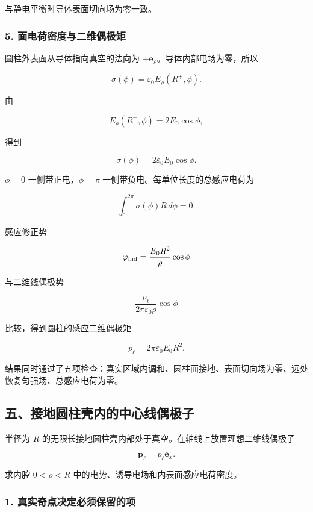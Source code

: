 与静电平衡时导体表面切向场为零一致。

\subsubsection{5.
面电荷密度与二维偶极矩}\label{m2:ux9762ux7535ux8377ux5bc6ux5ea6ux4e0eux4e8cux7ef4ux5076ux6781ux77e9}

圆柱外表面从导体指向真空的法向为
\(+\mathbf e_{\rho}\)。导体内部电场为零，所以

\[
\sigma(\phi)
=\varepsilon_0E_{\rho}(R^+,\phi).
\]

由

\[
E_{\rho}(R^+,\phi)=2E_0\cos\phi,
\]

得到

\[
\boxed{
\sigma(\phi)
=2\varepsilon_0E_0\cos\phi
}.
\]

\(\phi=0\) 一侧带正电，\(\phi=\pi\) 一侧带负电。每单位长度的总感应电荷为

\[
\int_0^{2\pi}\sigma(\phi)R\,d\phi=0.
\]

感应修正势

\[
\varphi_{\rm ind}
=\frac{E_0R^2}{\rho}\cos\phi
\]

与二维线偶极势

\[
\frac{p_{\ell}}{2\pi\varepsilon_0\rho}\cos\phi
\]

比较，得到圆柱的感应二维偶极矩

\[
\boxed{
p_{\ell}=2\pi\varepsilon_0E_0R^2
}.
\]

结果同时通过了五项检查：真实区域内调和、圆柱面接地、表面切向场为零、远处恢复匀强场、总感应电荷为零。

\subsection{五、接地圆柱壳内的中心线偶极子}\label{m2:ux4e94ux63a5ux5730ux5706ux67f1ux58f3ux5185ux7684ux4e2dux5fc3ux7ebfux5076ux6781ux5b50}

半径为 \(R\)
的无限长接地圆柱壳内部处于真空。在轴线上放置理想二维线偶极子

\[
\mathbf p_{\ell}=p_{\ell}\mathbf e_x.
\]

求内腔 \(0<\rho<R\) 中的电势、诱导电场和内表面感应电荷密度。

\subsubsection{1.
真实奇点决定必须保留的项}\label{m2:ux771fux5b9eux5947ux70b9ux51b3ux5b9aux5fc5ux987bux4fddux7559ux7684ux9879}

